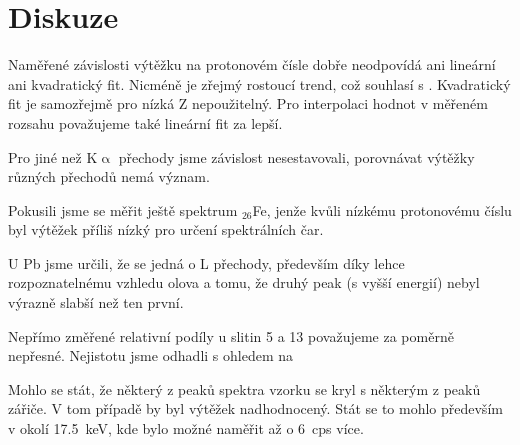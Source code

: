 \section*{Diskuze}
Naměřené závislosti výtěžku na protonovém čísle dobře neodpovídá ani lineární ani kvadratický fit. Nicméně je zřejmý rostoucí trend, což souhlasí s \cite{skripta}. Kvadratický fit je samozřejmě pro nízká Z nepoužitelný. Pro interpolaci hodnot v měřeném rozsahu považujeme také lineární fit za lepší.

Pro jiné než K$\upalpha$ přechody jsme závislost nesestavovali, porovnávat výtěžky různých přechodů nemá význam.

Pokusili jsme se měřit ještě spektrum $_{26}$Fe, jenže kvůli nízkému protonovému číslu byl výtěžek příliš nízký pro určení spektrálních čar.

U Pb jsme určili, že se jedná o L přechody, především díky lehce rozpoznatelnému vzhledu olova a tomu, že druhý peak (s vyšší energií) nebyl výrazně slabší než ten první.

Nepřímo změřené relativní podíly u slitin 5 a 13 považujeme za poměrně nepřesné. Nejistotu jsme odhadli s ohledem na 

Mohlo se stát, že některý z peaků spektra vzorku se kryl s některým z peaků zářiče. V tom případě by byl výtěžek nadhodnocený. Stát se to mohlo především v okolí \SI{17.5}{\keV}, kde bylo možné naměřit až o \SI{6}{cps} více. 